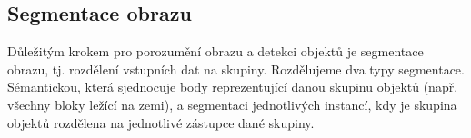 \documentclass[twoside]{ctuthesis}
\begin{document}

\subsection{Segmentace obrazu}
\label{subsection:segmentation}
Důležitým krokem pro porozumění obrazu a detekci objektů je segmentace obrazu, tj. rozdělení vstupních dat na skupiny. Rozdělujeme dva typy segmentace. Sémantickou, která sjednocuje body reprezentující danou skupinu objektů (např. všechny bloky ležící na zemi), a segmentaci jednotlivých instancí, kdy je skupina objektů rozdělena na jednotlivé zástupce dané skupiny. 
\end{document}
